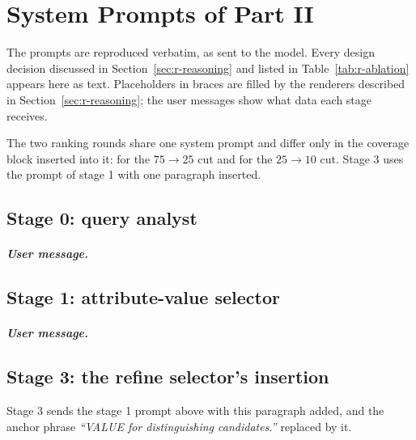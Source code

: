 \chapter{System Prompts of Part II}
\label{app:prompts}

The prompts are reproduced verbatim, as sent to the model. Every design decision
discussed in Section~\ref{sec:r-reasoning} and listed in Table~\ref{tab:r-ablation}
appears here as text. Placeholders in braces are filled by the renderers described
in Section~\ref{sec:r-reasoning}; the user messages show what data each stage
receives.

The two ranking rounds share one system prompt and differ only in the coverage
block inserted into it:  for the $75\rightarrow25$ cut and
 for the $25\rightarrow10$ cut. Stage 3 uses the prompt of
stage 1 with one paragraph inserted.

\section{Stage 0: query analyst}
\paragraph{User message.}

\section{Stage 1: attribute-value selector}
\paragraph{User message.}

\section{Stage 3: the refine selector's insertion}
Stage 3 sends the stage 1 prompt above with this paragraph added, and the anchor
phrase \emph{``VALUE for distinguishing candidates.''} replaced by it.

